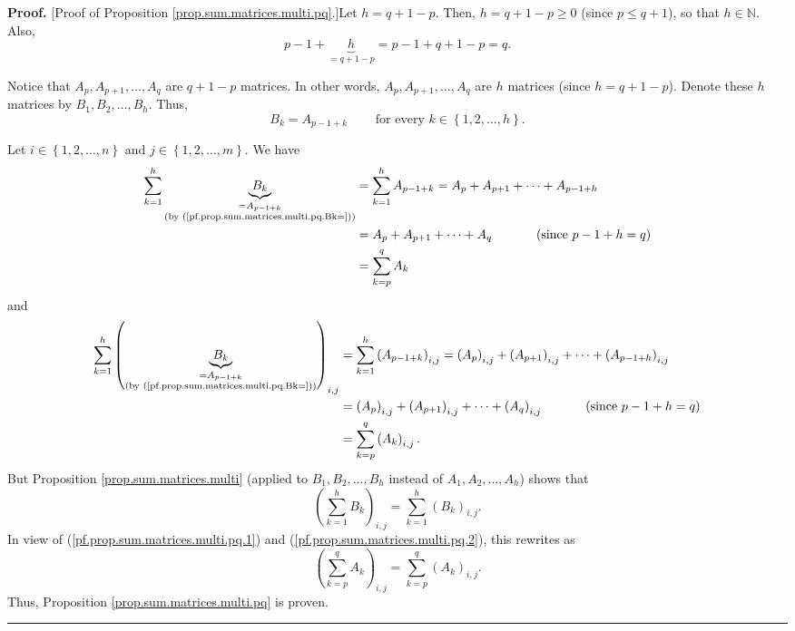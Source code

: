 \documentclass[numbers=enddot,12pt,final,onecolumn,notitlepage]{scrartcl}%
\theoremstyle{definition}
\newenvironment{proof}[1][Proof]{\noindent\textbf{#1.} }{\ \rule{0.5em}{0.5em}}
\let\sumnonlimits\sum
\renewcommand{\sum}{\sumnonlimits\limits}
\begin{document}
\begin{proof}
[Proof of Proposition \ref{prop.sum.matrices.multi.pq}.]Let $h=q+1-p$. Then,
$h=q+1-p\geq0$ (since $p\leq q+1$), so that $h\in\mathbb{N}$. Also,
\[
p-1+\underbrace{h}_{=q+1-p}=p-1+q+1-p=q.
\]


Notice that $A_{p},A_{p+1},\ldots,A_{q}$ are $q+1-p$ matrices. In other words,
$A_{p},A_{p+1},\ldots,A_{q}$ are $h$ matrices (since $h=q+1-p$). Denote these
$h$ matrices by $B_{1},B_{2},\ldots,B_{h}$. Thus,
\begin{equation}
B_{k}=A_{p-1+k}\ \ \ \ \ \ \ \ \ \ \text{for every }k\in\left\{
1,2,\ldots,h\right\}  . \label{pf.prop.sum.matrices.multi.pq.Bk=}%
\end{equation}


Let $i\in\left\{  1,2,\ldots,n\right\}  $ and $j\in\left\{  1,2,\ldots
,m\right\}  $. We have
\begin{align}
\sum_{k=1}^{h}\underbrace{B_{k}}_{\substack{=A_{p-1+k}\\\text{(by
(\ref{pf.prop.sum.matrices.multi.pq.Bk=}))}}}  &  =\sum_{k=1}^{h}%
A_{p-1+k}=A_{p}+A_{p+1}+\cdots+A_{p-1+h}\nonumber\\
&  =A_{p}+A_{p+1}+\cdots+A_{q}\ \ \ \ \ \ \ \ \ \ \left(  \text{since
}p-1+h=q\right) \nonumber\\
&  =\sum_{k=p}^{q}A_{k} \label{pf.prop.sum.matrices.multi.pq.1}%
\end{align}
and%
\begin{align}
\sum_{k=1}^{h}\left(  \underbrace{B_{k}}_{\substack{=A_{p-1+k}\\\text{(by
(\ref{pf.prop.sum.matrices.multi.pq.Bk=}))}}}\right)  _{i,j}  &  =\sum
_{k=1}^{h}\left(  A_{p-1+k}\right)  _{i,j}=\left(  A_{p}\right)
_{i,j}+\left(  A_{p+1}\right)  _{i,j}+\cdots+\left(  A_{p-1+h}\right)
_{i,j}\nonumber\\
&  =\left(  A_{p}\right)  _{i,j}+\left(  A_{p+1}\right)  _{i,j}+\cdots+\left(
A_{q}\right)  _{i,j}\ \ \ \ \ \ \ \ \ \ \left(  \text{since }p-1+h=q\right)
\nonumber\\
&  =\sum_{k=p}^{q}\left(  A_{k}\right)  _{i,j}.
\label{pf.prop.sum.matrices.multi.pq.2}%
\end{align}
But Proposition \ref{prop.sum.matrices.multi} (applied to $B_{1},B_{2}%
,\ldots,B_{h}$ instead of $A_{1},A_{2},\ldots,A_{h}$) shows that%
\[
\left(  \sum_{k=1}^{h}B_{k}\right)  _{i,j}=\sum_{k=1}^{h}\left(  B_{k}\right)
_{i,j}.
\]
In view of (\ref{pf.prop.sum.matrices.multi.pq.1}) and
(\ref{pf.prop.sum.matrices.multi.pq.2}), this rewrites as%
\[
\left(  \sum_{k=p}^{q}A_{k}\right)  _{i,j}=\sum_{k=p}^{q}\left(  A_{k}\right)
_{i,j}.
\]
Thus, Proposition \ref{prop.sum.matrices.multi.pq} is proven.
\end{proof}
\end{document}

